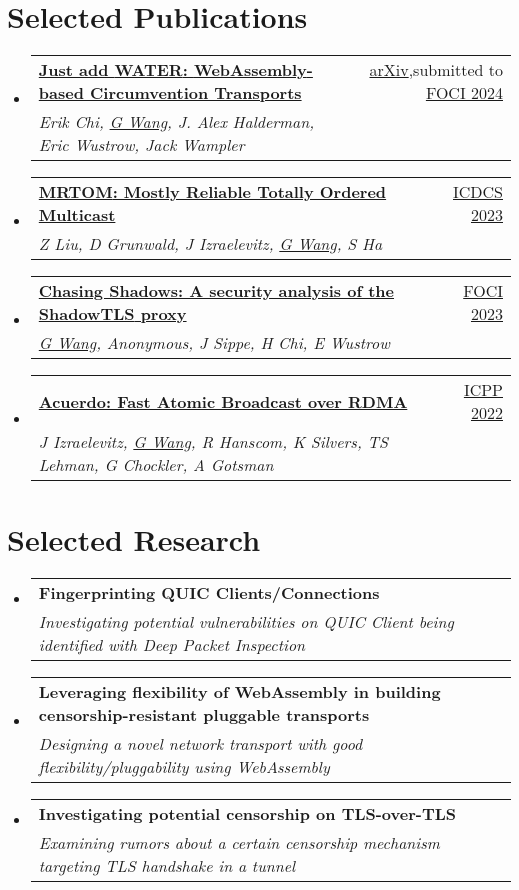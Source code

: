 \documentclass[letterpaper,11pt]{article}
\makeatletter
\newcommand{\resumeSubheading}[4]{
  \vspace{-2pt}\item
    \begin{tabular*}{0.97\textwidth}[t]{l@{\extracolsep{\fill}}r}
      \textbf{#1} & #2 \\
      \textit{\small#3} & \textit{\small #4} \\
    \end{tabular*}\vspace{-7pt}
}
\newcommand{\resumeSubHeadingListStart}{\begin{itemize}[leftmargin=0.15in, label={}]}
\newcommand{\resumeSubHeadingListEnd}{\end{itemize}}
\makeatother
\begin{document}
\section{Selected Publications}
\resumeSubHeadingListStart
  \resumeSubheading
  {\href{https://arxiv.org/abs/2312.00163}{\textbf{Just add {WATER}: {WebAssembly}-based Circumvention Transports}}}{\href{https://arxiv.org/}{arXiv},submitted to \href{https://foci.community/foci24.html}{FOCI 2024}}
  {Erik Chi, \underline{G Wang}, J. Alex Halderman, Eric Wustrow, Jack Wampler}{}
  \resumeSubheading
  {\href{https://ieeexplore.ieee.org/document/10272412}{\textbf{{MRTOM}: Mostly Reliable Totally Ordered Multicast}}}{\href{https://icdcs2023.icdcs.org/}{ICDCS 2023}}
  {Z Liu, D Grunwald, J Izraelevitz, \underline{G Wang}, S Ha}{}
  \resumeSubheading
  {\href{https://www.petsymposium.org/foci/2023/foci-2023-0002.php}{\textbf{{Chasing Shadows}: A security analysis of the {ShadowTLS} proxy}}}{\href{https://foci.community/foci23.html}{FOCI 2023}}
  {\underline{G Wang}, Anonymous, J Sippe, H Chi, E Wustrow}{}
  \resumeSubheading
  {\href{https://dl.acm.org/doi/abs/10.1145/3545008.3545041}{\textbf{Acuerdo: Fast Atomic Broadcast over {RDMA}}}}{\href{https://icpp22.gitlabpages.inria.fr/}{ICPP 2022}}
  {J Izraelevitz, \underline{G Wang}, R Hanscom, K Silvers, TS Lehman, G Chockler, A Gotsman}{}
\resumeSubHeadingListEnd
\vspace{1pt}

\section{Selected Research}
\resumeSubHeadingListStart
  \resumeSubheading
  {\textbf{Fingerprinting QUIC Clients/Connections}}{}
  {Investigating potential vulnerabilities on QUIC Client being identified with Deep Packet Inspection}{}
  \resumeSubheading
  {\textbf{Leveraging flexibility of {WebAssembly} in building censorship-resistant pluggable transports}}{}
  {Designing a novel network transport with good flexibility/pluggability using WebAssembly}{}
  \resumeSubheading
  {\textbf{Investigating potential censorship on TLS-over-TLS}}{}
  {Examining rumors about a certain censorship mechanism targeting TLS handshake in a tunnel}{}
\resumeSubHeadingListEnd
\vspace{1pt}

\end{document}
